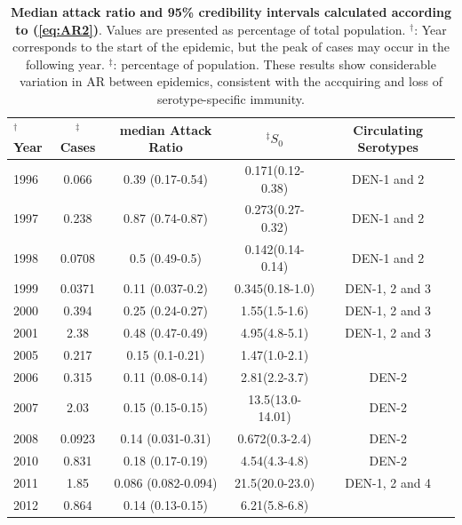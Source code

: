 \documentclass[10pt]{article}
\begin{document}
\begin{table}[!ht]
\caption{
{\bf Median attack ratio and 95\% credibility intervals calculated according to 
(\ref{eq:AR2})}. 
Values are presented as percentage of total population. 
$^\dag$: Year corresponds to the start of the epidemic, but the peak of cases
may occur in the following year.
$^\ddag$: percentage of population.
These results show considerable variation in AR between epidemics, consistent with
the accquiring and loss of serotype-specific immunity.}
\begin{center}
\begin{tabular}{l|c|c|c|c}
\hline
$^\dag$Year & $^\ddag$Cases & median Attack Ratio & $^\ddag$$S_0$ & Circulating 
 Serotypes \\
\hline
1996 & 0.066 & 0.39 (0.17-0.54) & 0.171(0.12-0.38)& DEN-1 and 
2\citep{nogueira1999dengue}\\
1997 & 0.238 & 0.87 (0.74-0.87) & 0.273(0.27-0.32)& DEN-1 and 
2\citep{nogueira1999dengue}\\
1998 & 0.0708 & 0.5 (0.49-0.5) & 0.142(0.14-0.14)& DEN-1 and 
2\citep{nogueira1999dengue}\\
1999 & 0.0371 & 0.11 (0.037-0.2) & 0.345(0.18-1.0)&DEN-1, 2 and 
3\citep{de2004dengue}\\
2000 & 0.394 & 0.25 (0.24-0.27) & 1.55(1.5-1.6)&DEN-1, 2 and 
3\citep{de2004dengue}\\
2001 & 2.38 & 0.48 (0.47-0.49) & 4.95(4.8-5.1)&DEN-1, 2 and 
3\citep{de2004dengue}\\
2005 & 0.217 & 0.15 (0.1-0.21) & 1.47(1.0-2.1)&\\
2006 & 0.315 & 0.11 (0.08-0.14) & 
2.81(2.2-3.7)&DEN-2\citep{nogueira2011dengue}\\
2007 & 2.03 & 0.15 (0.15-0.15) & 
13.5(13.0-14.01)&DEN-2\citep{nogueira2011dengue}\\
2008 & 0.0923 & 0.14 (0.031-0.31) & 
0.672(0.3-2.4)&DEN-2\citep{nogueira2011dengue}\\
2010 & 0.831 & 0.18 (0.17-0.19) & 
4.54(4.3-4.8)&DEN-2\citep{nogueira2011dengue}\\
2011 & 1.85 & 0.086 (0.082-0.094) & 
21.5(20.0-23.0)&DEN-1, 2 and 4\citep{nogueira2011dengue}\\
2012 & 0.864 & 0.14 (0.13-0.15) & 6.21(5.8-6.8)&\\

\hline
\end{tabular}
\end{center}
\label{tab:AR}
\end{table}
\end{document}

